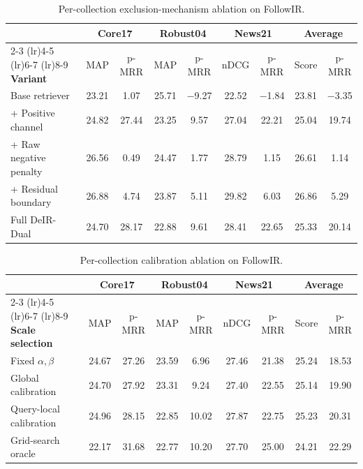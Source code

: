 \documentclass[letterpaper]{article}
\newcommand{\method}{DeIR-Dual}
\begin{document}
\begin{table}[!t]
\centering
\small
\begin{tabular}{l|cc|cc|cc|cc}
\toprule
& \multicolumn{2}{c|}{Core17} & \multicolumn{2}{c|}{Robust04} & \multicolumn{2}{c|}{News21} & \multicolumn{2}{c}{Average} \\
\cmidrule(lr){2-3} \cmidrule(lr){4-5} \cmidrule(lr){6-7} \cmidrule(lr){8-9}
\textbf{Variant} & MAP & p-MRR & MAP & p-MRR & nDCG & p-MRR & Score & p-MRR \\
\midrule
Base retriever & 23.21 & 1.07 & 25.71 & $-$9.27 & 22.52 & $-$1.84 & 23.81 & $-$3.35 \\
+ Positive channel & 24.82 & 27.44 & 23.25 & 9.57 & 27.04 & 22.21 & 25.04 & 19.74 \\
+ Raw negative penalty & 26.56 & 0.49 & 24.47 & 1.77 & 28.79 & 1.15 & 26.61 & 1.14 \\
+ Residual boundary & 26.88 & 4.74 & 23.87 & 5.11 & 29.82 & 6.03 & 26.86 & 5.29 \\
Full \method{} & 24.70 & 28.17 & 22.88 & 9.61 & 28.41 & 22.65 & 25.33 & 20.14 \\
\bottomrule
\end{tabular}
\caption{Per-collection exclusion-mechanism ablation on FollowIR.}
\label{tab:ablation-mechanism-full}
\end{table}

\begin{table}[!t]
\centering
\small
\begin{tabular}{l|cc|cc|cc|cc}
\toprule
& \multicolumn{2}{c|}{Core17} & \multicolumn{2}{c|}{Robust04} & \multicolumn{2}{c|}{News21} & \multicolumn{2}{c}{Average} \\
\cmidrule(lr){2-3} \cmidrule(lr){4-5} \cmidrule(lr){6-7} \cmidrule(lr){8-9}
\textbf{Scale selection} & MAP & p-MRR & MAP & p-MRR & nDCG & p-MRR & Score & p-MRR \\
\midrule
Fixed $\alpha,\beta$ & 24.67 & 27.26 & 23.59 & 6.96 & 27.46 & 21.38 & 25.24 & 18.53 \\
Global calibration & 24.70 & 27.92 & 23.31 & 9.24 & 27.40 & 22.55 & 25.14 & 19.90 \\
Query-local calibration & 24.96 & 28.15 & 22.85 & 10.02 & 27.87 & 22.75 & 25.23 & 20.31 \\
Grid-search oracle & 22.17 & 31.68 & 22.77 & 10.20 & 27.70 & 25.00 & 24.21 & 22.29 \\
\bottomrule
\end{tabular}
\caption{Per-collection calibration ablation on FollowIR.}
\label{tab:ablation-calibration-full}
\end{table}
\end{document}
